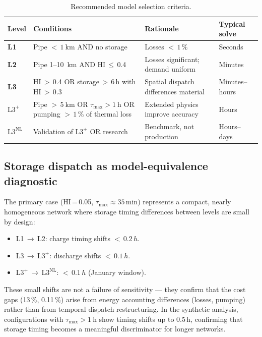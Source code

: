 \documentclass[review,3p]{elsarticle}
\newcommand{\Lplus}{\mathrm{L3}^{+}}
\newcommand{\Lnl}{\mathrm{L3}^{\mathrm{NL}}}
\begin{document}
\begin{table}[!htbp]
\centering
\caption{Recommended model selection criteria.}
\label{tab:criteria}
\begin{tabular}{@{} l p{6.0cm} p{3.5cm} l @{}}
\toprule
Level & Conditions & Rationale & Typical solve \\
\midrule
\textbf{L1}
  & Pipe ${<}\,\SI{1}{\kilo\metre}$ AND no storage
  & Losses ${<}\,1\,\%$
  & Seconds \\[6pt]
\textbf{L2}
  & Pipe 1--\SI{10}{\kilo\metre} AND HI\,$\leq$\,0.4
  & Losses significant; demand uniform
  & Minutes \\[6pt]
\textbf{L3}
  & HI\,$>$\,0.4 OR storage\,$>$\,6\,h with HI\,$>$\,0.3
  & Spatial dispatch differences material
  & Minutes--hours \\[6pt]
\textbf{$\Lplus$}
  & Pipe ${>}\,\SI{5}{\kilo\metre}$ OR $\tau_{\max} > \SI{1}{\hour}$
    OR pumping ${>}\,1\,\%$ of thermal loss
  & Extended physics improve accuracy
  & Hours \\[6pt]
\textbf{$\Lnl$}
  & Validation of $\Lplus$ OR research
  & Benchmark, not production
  & Hours--days \\
\bottomrule
\end{tabular}
\end{table}

\subsection{Storage dispatch as model-equivalence diagnostic}
\label{sec:disc_storage}

The primary case (HI\,=\,0.05, $\tau_{\max} \approx 35$\,min)
represents a compact, nearly homogeneous network where storage timing
differences between levels are small by design:
%
\begin{itemize}[nosep]
  \item L1\,$\to$\,L2: charge timing shifts ${<}\,0.2\,h$.
  \item L3\,$\to$\,$\Lplus$: discharge shifts ${<}\,0.1\,h$.
  \item $\Lplus$\,$\to$\,$\Lnl$: ${<}\,0.1\,h$ (January window).
\end{itemize}

These small shifts are not a failure of sensitivity --- they confirm
that the cost gaps (13\,\%, 0.11\,\%) arise from energy accounting
differences (losses, pumping) rather than from temporal dispatch
restructuring. In the synthetic analysis, configurations with
$\tau_{\max} > \SI{1}{\hour}$ show timing shifts up to
$0.5$\,h, confirming that storage timing becomes a meaningful
discriminator for longer networks.
\end{document}

